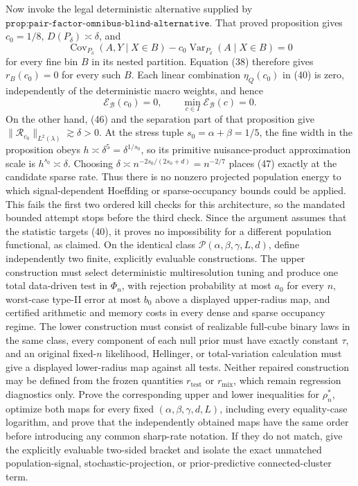 Now invoke the legal deterministic alternative supplied by \(\texttt{prop:pair-factor-omnibus-blind-alternative}\).  That proved proposition gives \(c_0=1/8\), \(D(P_\delta)\asymp\delta\), and
\[
 \operatorname{Cov}_{P_\delta}(A,Y\mid X\in B)
 -c_0\operatorname{Var}_{P_\delta}(A\mid X\in B)=0
\]
for every fine bin \(B\) in its nested partition.  Equation (38) therefore gives \(r_B(c_0)=0\) for every such \(B\).  Each linear combination \(\eta_Q(c_0)\) in (40) is zero, independently of the deterministic macro weights, and hence
\[
 \mathcal E_{\mathcal B}(c_0)=0,
 \qquad
 \min_{c\in I}\mathcal E_{\mathcal B}(c)=0.                                           \tag{47}
\]
On the other hand, (46) and the separation part of that proposition give \(\|\mathcal R_{c_0}\|_{L^2(\lambda)}\gtrsim\delta>0\).  At the stress tuple \(s_0=\alpha+\beta=1/5\), the fine width in the proposition obeys \(h\asymp\delta^5=\delta^{1/s_0}\), so its primitive nuisance-product approximation scale is \(h^{s_0}\asymp\delta\).  Choosing \(\delta\asymp n^{-2s_0/(2s_0+d)}=n^{-2/7}\) places (47) exactly at the candidate sparse rate.  Thus there is no nonzero projected population energy to which signal-dependent Hoeffding or sparse-occupancy bounds could be applied.  This fails the first two ordered kill checks for this architecture, so the mandated bounded attempt stops before the third check.  Since the argument assumes that the statistic targets (40), it proves no impossibility for a different population functional, as claimed.
On the identical class \(\mathcal P(\alpha,\beta,\gamma,L,d)\), define independently two finite, explicitly evaluable constructions.  The upper construction must select deterministic multiresolution tuning and produce one total data-driven test in \(\Phi_n\), with rejection probability at most \(a_0\) for every \(n\), worst-case type-II error at most \(b_0\) above a displayed upper-radius map, and certified arithmetic and memory costs in every dense and sparse occupancy regime.  The lower construction must consist of realizable full-cube binary laws in the same class, every component of each null prior must have exactly constant \(\tau\), and an original fixed-\(n\) likelihood, Hellinger, or total-variation calculation must give a displayed lower-radius map against all tests.  Neither repaired construction may be defined from the frozen quantities \(r_{\mathrm{test}}\) or \(r_{\mathrm{mix}}\), which remain regression diagnostics only.  Prove the corresponding upper and lower inequalities for \(\rho_n^*\), optimize both maps for every fixed \((\alpha,\beta,\gamma,d,L)\), including every equality-case logarithm, and prove that the independently obtained maps have the same order before introducing any common sharp-rate notation.  If they do not match, give the explicitly evaluable two-sided bracket and isolate the exact unmatched population-signal, stochastic-projection, or prior-predictive connected-cluster term.
